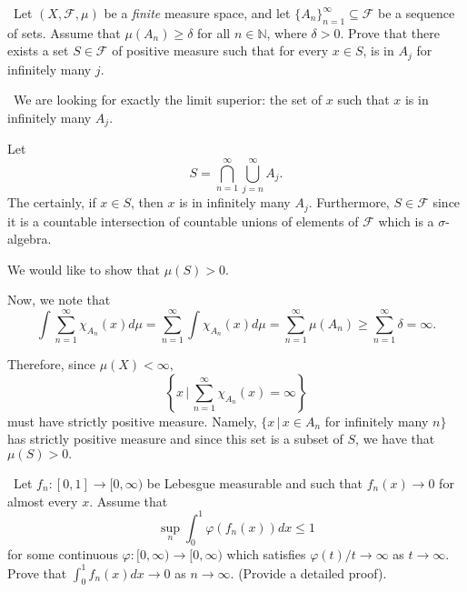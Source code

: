 \documentclass[12pt]{Homework}
\begin{document}
\begin{problem} $\,$
Let $(X,\mathscr{F},\mu)$ be a \textit{finite} measure space, and let $\{A_n\}_{n=1}^\infty\subseteq\mathscr{F}$ be a sequence of sets. Assume that $\mu(A_n)\ge\delta$ for all $n\in\mathbb{N}$, where $\delta>0$. Prove that there exists a set $S\in\mathscr{F}$ of positive measure such that for every $x\in S$, is in $A_j$ for infinitely many $j.$
\end{problem}


\begin{solution}$\,$
 We are looking for exactly the limit superior: the set of $x$ such that $x$ is in infinitely many $A_j.$
 
 Let $$S=\bigcap_{n=1}^\infty\bigcup_{j=n}^\infty A_j.$$ The certainly, if $x\in S$, then $x$ is in infinitely many $A_j.$ Furthermore, $S\in\mathscr{F}$ since it is a countable intersection of countable unions  of elements of $\mathscr{F}$ which is a $\sigma$-algebra.
 
 We would like to show that $\mu(S)>0.$
 
 Now, we note that $$\int\sum_{n=1}^\infty\chi_{A_n}(x)d\mu=\sum_{n=1}^\infty\int\chi_{A_n}(x)d\mu=\sum_{n=1}^\infty\mu(A_n)\ge\sum_{n=1}^\infty\delta=\infty.$$
 
 Therefore, since $\mu(X)<\infty,$ $$\left\{x\,|\,\sum_{n=1}^\infty\chi_{A_n}(x)=\infty\right\}$$ must have strictly positive measure. Namely, $\{x\,|\,x\in A_n$ for infinitely many $n\}$ has strictly positive measure and since this set is a subset of $S$, we have that $\mu(S)>0.$
 
\end{solution}
\newpage




\begin{problem} $\,$
Let $f_n:[0,1]\to[0,\infty)$ be Lebesgue measurable and such that $f_n(x)\to0$ for almost every $x.$ Assume that $$\sup_n\int_0^1\varphi(f_n(x))dx\le 1$$ for some continuous $\varphi:[0,\infty)\to[0,\infty)$ which satisfies $\varphi(t)/t\to\infty$ as $t\to\infty.$ Prove that $\int_0^1f_n(x)dx\to0$ as $n\to\infty.$ (Provide a detailed proof).
\end{problem}
\end{document}
